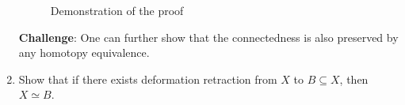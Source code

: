 \begin{exercise}
\begin{enumerate}
\begin{answer}
			      \begin{figure}[H]
				      \centering
				      \caption{Demonstration of the proof}
				      \label{fig:eg:path-connected}
			      \end{figure}
		      \end{answer}
		      \textbf{Challenge}: One can further show that the connectedness is also preserved by any homotopy equivalence.
		\item Show that if there exists deformation retraction from
		      \(X\) to \(B\subseteq X\), then \(X\simeq B\).
	\end{enumerate}
\end{exercise}
